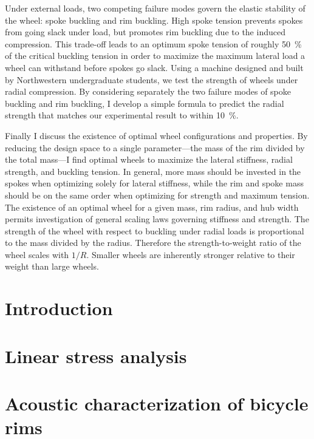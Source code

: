 \documentclass{nuthesis}
\begin{document}
{Under external loads, two competing failure modes govern the elastic stability of the wheel: spoke buckling and rim buckling. High spoke tension prevents spokes from going slack under load, but promotes rim buckling due to the induced compression. This trade-off leads to an optimum spoke tension of roughly \SI{50}{\percent} of the critical buckling tension in order to maximize the maximum lateral load a wheel can withstand before spokes go slack. Using a machine designed and built by Northwestern undergraduate students, we test the strength of wheels under radial compression. By considering separately the two failure modes of spoke buckling and rim buckling, I develop a simple formula to predict the radial strength that matches our experimental result to within \SI{10}{\percent}.

Finally I discuss the existence of optimal wheel configurations and properties. By reducing the design space to a single parameter---the mass of the rim divided by the total mass---I find optimal wheels to maximize the lateral stiffness, radial strength, and buckling tension. In general, more mass should be invested in the spokes when optimizing solely for lateral stiffness, while the rim and spoke mass should be on the same order when optimizing for strength and maximum tension. The existence of an optimal wheel for a given mass, rim radius, and hub width permits investigation of general scaling laws governing stiffness and strength. The strength of the wheel with respect to buckling under radial loads is proportional to the mass divided by the radius. Therefore the strength-to-weight ratio of the wheel scales with $1/R$. Smaller wheels are inherently stronger relative to their weight than large wheels.
}

\tableofcontents


\chapter{Introduction}
\label{chap:introduction}



\chapter{Linear stress analysis}
\label{chap:stress_analysis}



\chapter{Acoustic characterization of bicycle rims}
\label{chap:acoustic_testing}

\end{document}
